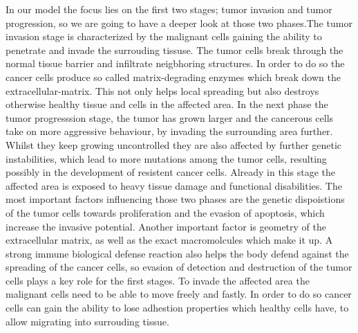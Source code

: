 In our model the focus lies on the first two stages; tumor invasion and tumor progression, so we are going to have a deeper look at those two phases.The tumor invasion stage is characterized by the malignant cells gaining the ability to penetrate and invade the surrouding tissuse. The tumor cells break through the normal tissue barrier and infiltrate neigbhoring structures. In order to do so the cancer cells produce so called matrix-degrading enzymes which break down the extracellular-matrix. This not only helps local spreading but also destroys otherwise healthy tissue and cells in the affected area. In the next phase the tumor progresssion stage, the tumor has grown larger and the cancerous cells take on more aggressive behaviour, by invading the surrounding area further. Whilst they keep growing uncontrolled they are also affected by further genetic instabilities, which lead to more mutations among the tumor cells, resulting possibly in the development of resistent cancer cells. Already in this stage the affected area is exposed to heavy tissue damage and functional disabilities.\newline
The most important factors influencing those two phases are the genetic dispoistions of the tumor cells towards proliferation and the evasion of apoptosis, which increase the invasive potential. Another important factor is geometry of the extracellular matrix, as well as the exact macromolcules which make it up. A strong immune biological defense reaction also helps the body defend against the spreading of the cancer cells, so evasion of detection and destruction of the tumor cells plays a key role for the first stages. To invade the affected area the malignant cells need to be able to move freely and fastly. In order to do so cancer cells can gain the ability to lose adhestion properties which healthy cells have, to allow migrating into surrouding tissue. 

